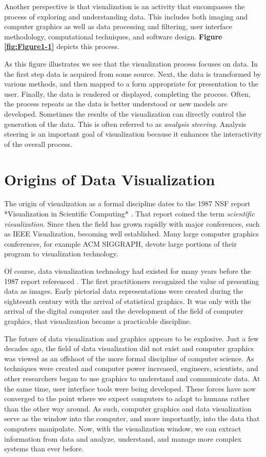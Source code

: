 Another perspective is that visualization is an activity that encompasses the process of exploring and understanding data. This includes both imaging and computer graphics as well as data processing and filtering, user interface methodology, computational techniques, and software design. \textbf{Figure \ref{fig:Figure1-1}} depicts this process.

As this figure illustrates we see that the visualization process focuses on data. In the first step data is acquired from some source. Next, the data is transformed by various methods, and then mapped to a form appropriate for presentation to the user. Finally, the data is rendered or displayed, completing the process. Often, the process repeats as the data is better understood or new models are developed. Sometimes the results of the visualization can directly control the generation of the data. This is often referred to as \emph{analysis steering}. Analysis steering is an important goal of visualization because it enhances the interactivity of the overall process.

\section{Origins of Data Visualization}

The origin of visualization as a formal discipline dates to the 1987 NSF report *Visualization in Scientific Computing* \cite{McCormick87}. That report coined the term \emph{scientific visualization}. Since then the field has grown rapidly with major conferences, such as IEEE Visualization, becoming well established. Many large computer graphics conferences, for example ACM SIGGRAPH, devote large portions of their program to visualization technology.

Of course, data visualization technology had existed for many years before the 1987 report referenced \cite{Tufte83}. The first practitioners recognized the value of presenting data as images. Early pictorial data representations were created during the eighteenth century with the arrival of statistical graphics. It was only with the arrival of the digital computer and the development of the field of computer graphics, that visualization became a practicable discipline.

The future of data visualization and graphics appears to be explosive. Just a few decades ago, the field of data visualization did not exist and computer graphics was viewed as an offshoot of the more formal discipline of computer science. As techniques were created and computer power increased, engineers, scientists, and other researchers began to use graphics to understand and communicate data. At the same time, user interface tools were being developed. These forces have now converged to the point where we expect computers to adapt to humans rather than the other way around. As such, computer graphics and data visualization serve as the window into the computer, and more importantly, into the data that computers manipulate. Now, with the visualization window, we can extract information from data and analyze, understand, and manage more complex systems than ever before.

